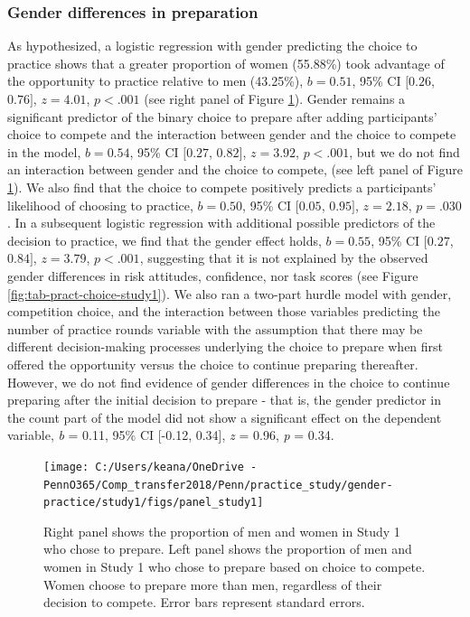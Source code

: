 \documentclass[a4paper, nobind]{templates/ociamthesis}
\begin{document}
\hypertarget{gender-differences-in-preparation}{%
\subsubsection{Gender differences in preparation}\label{gender-differences-in-preparation}}

As hypothesized, a logistic regression with gender predicting the choice to practice shows that a greater proportion of women (55.88\%) took advantage of the opportunity to practice relative to men (43.25\%), \(b = 0.51\), 95\% CI \([0.26\), \(0.76]\), \(z = 4.01\), \(p < .001\) (see right panel of Figure \ref{fig:panel-study1}). Gender remains a significant predictor of the binary choice to prepare after adding participants' choice to compete and the interaction between gender and the choice to compete in the model, \(b = 0.54\), 95\% CI \([0.27\), \(0.82]\), \(z = 3.92\), \(p < .001\), but we do not find an interaction between gender and the choice to compete, (see left panel of Figure \ref{fig:panel-study1}). We also find that the choice to compete positively predicts a participants' likelihood of choosing to practice, \(b = 0.50\), 95\% CI \([0.05\), \(0.95]\), \(z = 2.18\), \(p = .030\). In a subsequent logistic regression with additional possible predictors of the decision to practice, we find that the gender effect holds, \(b = 0.55\), 95\% CI \([0.27\), \(0.84]\), \(z = 3.79\), \(p < .001\), suggesting that it is not explained by the observed gender differences in risk attitudes, confidence, nor task scores (see Figure \ref{fig:tab-pract-choice-study1}). We also ran a two-part hurdle model with gender, competition choice, and the interaction between those variables predicting the number of practice rounds variable with the assumption that there may be different decision-making processes underlying the choice to prepare when first offered the opportunity versus the choice to continue preparing thereafter. However, we do not find evidence of gender differences in the choice to continue preparing after the initial decision to prepare - that is, the gender predictor in the count part of the model did not show a significant effect on the dependent variable, \emph{b} = 0.11, 95\% CI {[}-0.12, 0.34{]}, \emph{z} = 0.96, \emph{p} = 0.34.

\begin{figure}

{\centering \texttt{[image: C:/Users/keana/OneDrive - PennO365/Comp\_transfer2018/Penn/practice\_study/gender-practice/study1/figs/panel\_study1]} 

}

\caption{Right panel shows the proportion of men and women in Study 1 who chose to prepare. Left panel shows the proportion of men and women in Study 1 who chose to prepare based on choice to compete. Women choose to prepare more than men, regardless of their decision to compete. Error bars represent standard errors.}\label{fig:panel-study1}
\end{figure}
\end{document}

